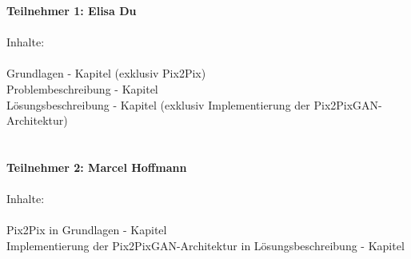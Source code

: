 \textbf{Teilnehmer 1:  Elisa Du} \\
\\
 Inhalte: \\
\\ Grundlagen - Kapitel (exklusiv Pix2Pix)
\\ Problembeschreibung - Kapitel
\\ Lösungsbeschreibung - Kapitel (exklusiv Implementierung der Pix2PixGAN-Architektur)
\\
\\
\\
\textbf{Teilnehmer 2: Marcel Hoffmann} \\
\\
 Inhalte: \\
\\ Pix2Pix in Grundlagen - Kapitel
\\ Implementierung der Pix2PixGAN-Architektur in Lösungsbeschreibung - Kapitel
\\
\\
\\
